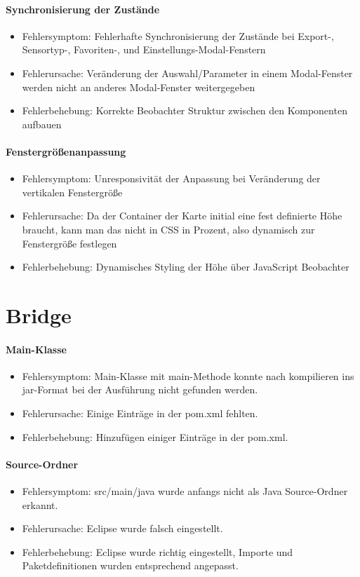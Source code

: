 \paragraph{Synchronisierung der Zustände}
\begin{itemize}
	\item Fehlersymptom: Fehlerhafte Synchronisierung der Zustände bei Export-, Sensortyp-, Favoriten-, und Einstellungs-Modal-Fenstern
	\item Fehlerursache: Veränderung der Auswahl/Parameter in einem Modal-Fenster werden nicht an anderes Modal-Fenster weitergegeben
	\item Fehlerbehebung: Korrekte Beobachter Struktur zwischen den Komponenten aufbauen
\end{itemize}

\paragraph{Fenstergrößenanpassung}
\begin{itemize}
	\item Fehlersymptom: Unresponsivität der Anpassung bei Veränderung der vertikalen Fenstergröße
	\item Fehlerursache: Da der Container der Karte initial eine fest definierte Höhe braucht, kann man das nicht in CSS in Prozent, also dynamisch zur Fenstergröße festlegen
	\item Fehlerbehebung: Dynamisches Styling der Höhe über JavaScript Beobachter
\end{itemize}

\newpage
\section{Bridge}
\paragraph{Main-Klasse}
\begin{itemize}
	\item Fehlersymptom: Main-Klasse mit main-Methode konnte nach kompilieren ins jar-Format bei der Ausführung nicht gefunden werden.
	\item Fehlerursache: Einige Einträge in der pom.xml fehlten.
	\item Fehlerbehebung: Hinzufügen einiger Einträge in der pom.xml.
\end{itemize}

\paragraph{Source-Ordner}
\begin{itemize}
	\item Fehlersymptom: src/main/java wurde anfangs nicht als Java Source-Ordner erkannt.
	\item Fehlerursache: Eclipse wurde falsch eingestellt.
	\item Fehlerbehebung: Eclipse wurde richtig eingestellt, Importe und Paketdefinitionen wurden entsprechend angepasst.
\end{itemize}

